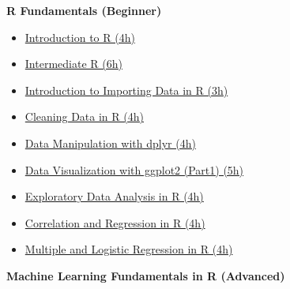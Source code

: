 \documentclass[
  11pt,
]{article}
\providecommand{\tightlist}{%
  \setlength{\itemsep}{0pt}\setlength{\parskip}{0pt}}
\newenvironment{tips}[1]
  {
  \begin{itemize}
  \footnotesize
  \renewcommand{\labelitemi}{
    \raisebox{-.7\height}[0pt][0pt]{
      {\setkeys{Gin}{width=3em,keepaspectratio}
        \texttt{[image: images/\#1.png]}}
    }
  }
  \setlength{\fboxsep}{1em}
  \begin{rbox}
  \item
  }
  {
  \end{rbox}
  \end{itemize}
  }
\begin{document}
\begin{tips}r

\textbf{R Fundamentals (Beginner)}

\begin{itemize}
\tightlist
\item
  \href{https://www.datacamp.com/courses/free-introduction-to-r}{Introduction to R (4h)}
\item
  \href{https://www.datacamp.com/courses/intermediate-r}{Intermediate R (6h)}
\item
  \href{https://www.datacamp.com/courses/importing-data-in-r-part-1}{Introduction to Importing Data in R (3h)}
\item
  \href{https://www.datacamp.com/courses/cleaning-data-in-r}{Cleaning Data in R (4h)}
\item
  \href{https://www.datacamp.com/courses/data-manipulation-with-dplyr-in-r}{Data Manipulation with dplyr (4h)}
\item
  \href{https://www.datacamp.com/courses/data-visualization-with-ggplot2-1}{Data Visualization with ggplot2 (Part1) (5h)}
\item
  \href{https://www.datacamp.com/courses/exploratory-data-analysis}{Exploratory Data Analysis in R (4h)}
\item
  \href{https://www.datacamp.com/courses/correlation-and-regression}{Correlation and Regression in R (4h)}
\item
  \href{https://www.datacamp.com/courses/multiple-and-logistic-regression}{Multiple and Logistic Regression in R (4h)}
\end{itemize}

\textbf{Machine Learning Fundamentals in R (Advanced)}


\end{tips}
\end{document}
